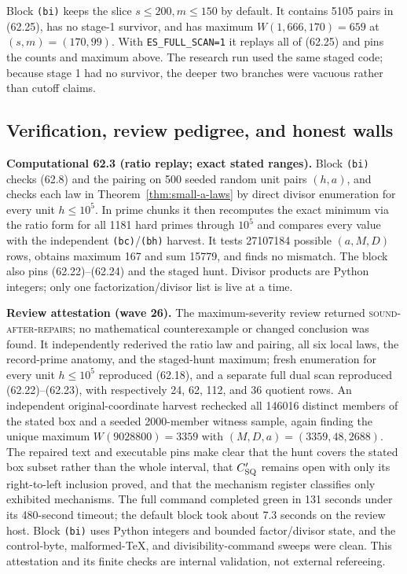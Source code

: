\documentclass[10pt,reqno]{amsart}
\theoremstyle{definition}
\newcommand{\1}{\mathbf 1}
\begin{document}
Block \texttt{(bi)} keeps the slice $s\leq200,m\leq150$ by default.  It
contains 5105 pairs in (62.25), has no stage-1 survivor, and has maximum
$W(1{,}666{,}170)=659$ at $(s,m)=(170,99)$.  With
\texttt{ES\_FULL\_SCAN=1} it replays all of (62.25) and pins the counts and
maximum above.  The research run used the same staged code; because stage 1
had no survivor, the deeper two branches were vacuous rather than cutoff
claims.

\subsection{Verification, review pedigree, and honest walls}
\medskip\noindent\textbf{Computational 62.3 (ratio replay; exact stated
ranges).}
Block \texttt{(bi)} checks (62.8) and the pairing on 500 seeded random unit
pairs $(h,a)$, and checks each law in Theorem~\ref{thm:small-a-laws} by
direct divisor enumeration for every unit $h\leq10^5$.  In prime chunks it
then recomputes the exact minimum via the ratio form for all 1181 hard
primes through $10^5$ and compares every value with the independent
\texttt{(bc)}/\texttt{(bh)} harvest.  It tests 27107184 possible $(a,M,D)$
rows, obtains maximum 167 and sum 15779, and finds no mismatch.  The block
also pins (62.22)--(62.24) and the staged hunt.  Divisor products are Python
integers; only one factorization/divisor list is live at a time.

\medskip\noindent\textbf{Review attestation (wave 26).}
The maximum-severity review returned \textsc{sound-after-repairs}; no
mathematical counterexample or changed conclusion was found.  It
independently rederived the ratio law and pairing, all six local laws, the
record-prime anatomy, and the staged-hunt maximum; fresh enumeration for
every unit $h\leq10^5$ reproduced (62.18), and a separate full dual scan
reproduced (62.22)--(62.23), with respectively 24, 62, 112, and 36 quotient
rows.  An independent original-coordinate harvest rechecked all 146016
distinct members of the stated box and a seeded 2000-member witness sample,
again finding the unique maximum $W(9028800)=3359$ with
$(M,D,a)=(3359,48,2688)$.  The repaired text and executable pins make clear
that the hunt covers the stated box subset rather than the whole interval,
that $C_{\rm SQ}'$ remains open with only its right-to-left inclusion proved,
and that the mechanism register classifies only exhibited mechanisms.  The
full command completed green in 131 seconds under its 480-second timeout;
the default block took about 7.3 seconds on the review host.  Block
\texttt{(bi)} uses Python integers and bounded factor/divisor state, and the
control-byte, malformed-TeX, and divisibility-command sweeps were clean.
This attestation and its finite checks are internal validation, not external
refereeing.
\end{document}
